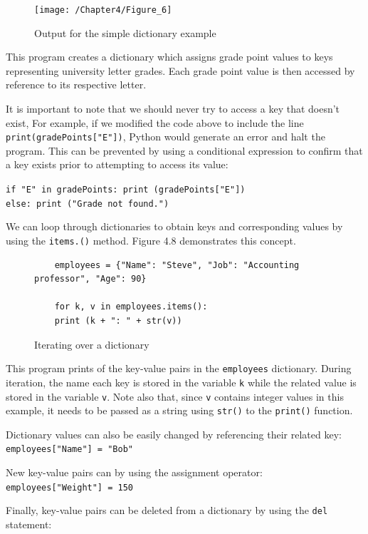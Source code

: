 \documentclass{book}
\begin{document}
\begin{figure}[h]
	\caption{Output for the simple dictionary example}
	\centering\texttt{[image: /Chapter4/Figure\_6]}
\end{figure}

This program creates a dictionary which assigns grade point values to keys representing university letter grades. Each grade point value is then accessed by reference to its respective letter. 

It is important to note that we should never try to access a key that doesn't exist,  For example, if we modified the code above to include the line \texttt{print(gradePoints["E"])}, Python would generate an error and halt the program. This can be prevented by using a conditional expression to confirm that a key exists prior to attempting to access its value:

\texttt{if "E" in gradePoints: print (gradePoints["E"])}\\
\texttt{else: print ("Grade not found.")}

We can loop through dictionaries to obtain keys and corresponding values by using the \texttt{items.()} method. Figure 4.8 demonstrates this concept. 

\begin{figure}[h]
\caption{Iterating over a dictionary}
\begin{lstlisting}
	employees = {"Name": "Steve", "Job": "Accounting professor", "Age": 90}
	
	for k, v in employees.items():
	print (k + ": " + str(v))
\end{lstlisting}
\end{figure}

This program prints of the key-value pairs in the \texttt{employees} dictionary. During iteration, the name each key is stored in the variable \texttt{k} while the related value is stored in the variable \texttt{v}. Note also that, since \texttt{v} contains integer values in this example, it needs to be passed as a string using \texttt{str()} to the \texttt{print()} function.

Dictionary values can also be easily changed by referencing their related key: \\ \texttt{employees["Name"] = "Bob"}

New key-value pairs can by using the assignment operator: \\ \texttt{employees["Weight"] = 150}

Finally, key-value pairs can be deleted from a dictionary by using the \texttt{del} statement:
\end{document}
